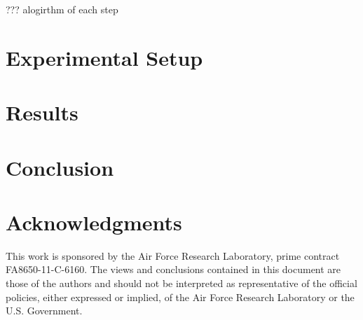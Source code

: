 \documentclass[]{article}
\begin{document}
??? alogirthm of each step


\section{Experimental Setup}
\label{sec:Experimental Setup}


\section{Results}
\label{sec:Results}



\section{Conclusion}



 \section*{Acknowledgments}
This work is sponsored by the Air Force Research Laboratory, prime contract FA8650-11-C-6160.  The views and conclusions contained in this document are those of the authors and should not be interpreted as representative of the official policies, either expressed or implied, of the Air Force Research Laboratory or the U.S. Government.



\end{document}
